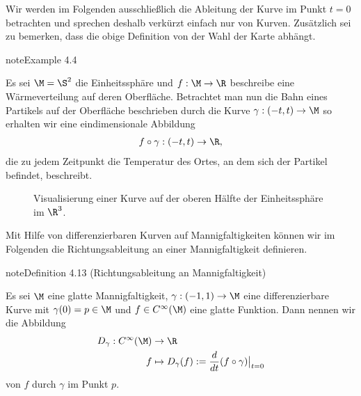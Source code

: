 \documentclass[letterpaper,10pt,english]{jupyterBook}
\let\sphinxpxdimen\pdfpxdimen\else\newdimen\sphinxpxdimen
\begin{document}
\sphinxAtStartPar
Wir werden im Folgenden ausschließlich die Ableitung der Kurve im Punkt \(t=0\) betrachten und sprechen deshalb verkürzt einfach nur von  Kurven.
Zusätzlich sei zu bemerken, dass die obige Definition  von der Wahl der Karte abhängt.
\label{manifolds/tangential:example-2}
\begin{sphinxadmonition}{note}{Example 4.4}



\sphinxAtStartPar
Es sei \(\M=\S^2\) die Einheitssphäre und \(f:\M\to\R\) beschreibe eine Wärmeverteilung auf deren Oberfläche.
Betrachtet man nun die Bahn eines Partikels auf der Oberfläche beschrieben durch die Kurve \(\gamma:(-t, t)\to \M\) so erhalten wir eine eindimensionale Abbildung
\begin{equation*}
\begin{split}f\circ\gamma:(-t,t)\to \R,\end{split}
\end{equation*}
\sphinxAtStartPar
die zu jedem Zeitpunkt die Temperatur des Ortes, an dem sich der Partikel befindet, beschreibt.
\end{sphinxadmonition}

\begin{figure}[htbp]
\centering
\capstart

\noindent\sphinxincludegraphics[width=350\sphinxpxdimen,height=300\sphinxpxdimen]{{velocity}.jpg}
\caption{Visualisierung einer Kurve auf der oberen Hälfte der Einheitssphäre im \(\R^3\).}\label{\detokenize{manifolds/tangential:fig-velocity}}\end{figure}

\sphinxAtStartPar
Mit Hilfe von differenzierbaren Kurven auf Mannigfaltigkeiten können wir im Folgenden die Richtungsableitung an einer Mannigfaltigkeit definieren.
\label{manifolds/tangential:def:direcdiv}
\begin{sphinxadmonition}{note}{Definition 4.13 (Richtungsableitung an Mannigfaltigkeit)}



\sphinxAtStartPar
Es sei \(\M\) eine glatte Mannigfaltigkeit, \(\gamma:(-1,1)\to\M\) eine differenzierbare Kurve mit \(\gamma(0)=p\in\M\) und \(f \in C^\infty(\M)\) eine glatte Funktion.
Dann nennen wir die Abbildung
\begin{equation*}
\begin{split}D_\gamma : C^\infty(\M) &\to \R\\
f &\mapsto D_\gamma(f):=\frac{d}{dt}(f\circ \gamma)\big\rvert_{t=0}\end{split}
\end{equation*}
\sphinxAtStartPar
{} von \(f\) durch \(\gamma\) im Punkt \(p\).
\end{sphinxadmonition}
\end{document}
